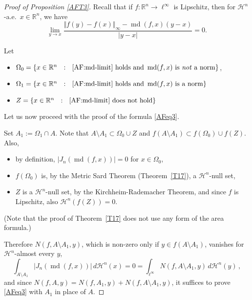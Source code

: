 \documentclass[12pt,leqno]{amsart}
\theoremstyle{definition}
\newcommand{\bbbr}{\mathbb R}
\def\H{{\mathcal H}}
\def\md{\operatorname{md}}
\numberwithin{theorem}{section} \numberwithin{equation}{section}
\begin{document}
\begin{proof}[Proof of Proposition \ref{AFT3}]
Recall that if $f:\bbbr^n\to\ell^\infty$ is Lipschitz, then for $\H^n$-a.e.\ $x\in\bbbr^n$, we have
\begin{equation}
\label{AF:md-limit}
\lim_{y\to x}
\frac{\Vert f(y)-f(x)\Vert_\infty-\md(f,x)(y-x)}{|y-x|}=0.
\end{equation}

Let
\begin{itemize}
\item $\Omega_0=\{x\in\bbbr^n~~:~~\text{\eqref{AF:md-limit} holds and }\md(f,x)\text{ is \emph{not} a norm}\}$,
\item $\Omega_1=\{x\in\bbbr^n~~:~~\text{\eqref{AF:md-limit} holds and }\md(f,x)\text{ is a norm}\}$
\item $Z=\{x\in\bbbr^n~~:~~\text{\eqref{AF:md-limit} does not hold}\}$
\end{itemize}

Let us now proceed with the proof of the formula \eqref{AFeq3}.

Set $A_1:=\Omega_1 \cap A$. Note that $A\setminus A_1\subset \Omega_0\cup Z$ and $f(A\setminus A_1)\subset f(\Omega_0)\cup f(Z)$. Also,
\begin{itemize}
\item by definition, $|J_n(\md(f,x))|=0$ for $x\in \Omega_0$,
\item $f(\Omega_0)$ is, by the  Metric Sard Theorem (Theorem~\ref{T17}),  a $\H^n$-null set,
\item $Z$ is a $\H^n$-null set,  by the Kirchheim-Rademacher Theorem, and since $f$ is Lipschitz, also ${\H^n(f(Z))=0}$.
\end{itemize}
(Note that the proof of Theorem~\ref{T17} does not use any form of the area formula.)

Therefore $N(f,A\setminus A_1,y)$, which is non-zero only if $y\in f(A\setminus A_1)$, vanishes for $\H^n$-almost every $y$,
\begin{equation}
\label{eqnull}
\int_{A\setminus A_1} |J_n(\md(f,x))| \, d\H^n(x) = 0=\int_{\ell^\infty} N(f,A\setminus A_1,y) \, d\H^n(y) \,,
\end{equation}
and since $N(f,A,y)=N(f,A_1,y)+N(f,A\setminus A_1,y)$, it suffices to prove \eqref{AFeq3} with $A_1$ in place of $A$.


\end{proof}
\end{document}
